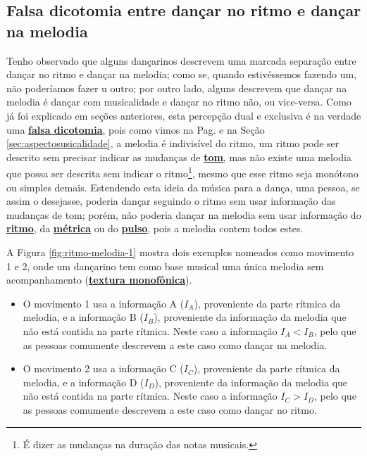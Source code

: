 \subsection{Falsa dicotomia entre dançar no ritmo e dançar na melodia}
\label{sec:ritmovsmelodia}
Tenho observado que alguns dançarinos descrevem uma marcada separação entre dançar no ritmo e
dançar na melodia; como se, quando estivéssemos fazendo um, não poderíamos fazer u outro;
por outro lado, alguns descrevem que dançar na melodia é dançar com musicalidade e dançar no ritmo não,
ou vice-versa.
Como já foi explicado em seções anteriores, esta percepção dual e exclusiva é
na verdade uma  \hyperref[ref:falsadilema]{\textbf{falsa dicotomia}},
pois como vimos na Pag. \pageref{sec:pos:Melodia} e na Seção \ref{sec:aspectosusicalidade},
a melodia é indivisível do ritmo, 
um ritmo pode ser descrito sem precisar indicar as mudanças de \hyperref[sec:pos:Altura]{\textbf{tom}},
mas não existe uma melodia que possa ser descrita sem indicar o ritmo\footnote{É dizer as mudanças na duração das notas musicais.},
mesmo que esse ritmo seja monótono ou simples demais.
Estendendo esta ideia da música para a dança, uma pessoa, se assim o desejasse, poderia 
dançar seguindo o ritmo sem usar informação das mudanças de tom;
porém, não poderia dançar na melodia sem usar informação do \hyperref[sec:pos:Ritmo]{\textbf{ritmo}}, 
da \hyperref[def:Metrica]{\textbf{métrica}} ou do \hyperref[ref:Pulso]{\textbf{pulso}},
pois a melodia contem todos estes.
\begin{example}
\label{ex:ritmovsmelodia}
A Figura \ref{fig:ritmo-melodia-1} mostra dois exemplos nomeados como movimento 1 e 2,
onde um dançarino tem como base musical uma única melodia sem acompanhamento 
(\hyperref[subsec:monofonica]{\textbf{textura monofônica}}).
\begin{itemize}
\item O movimento 1 usa a informação A ($I_{A}$), proveniente da parte rítmica da melodia,
e a informação B ($I_{B}$), proveniente da informação da melodia que não está contida na parte rítmica.
Neste caso a informação $I_A < I_B$, pelo que as pessoas comumente descrevem a este caso como dançar na melodia.  
\item O movimento 2 usa a informação C ($I_{C}$), proveniente da parte rítmica da melodia,
e a informação D ($I_{D}$), proveniente da informação da melodia que não está contida na parte rítmica.
Neste caso a informação $I_C > I_D$, pelo que as pessoas comumente descrevem a este caso como dançar no ritmo.
\end{itemize}
\end{example}

